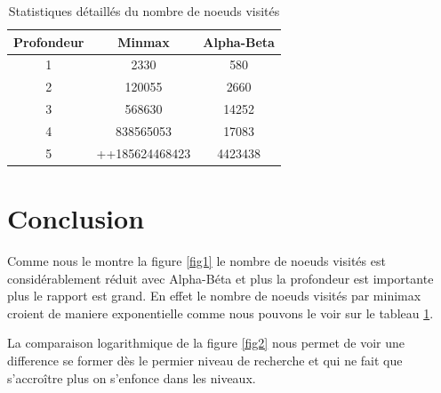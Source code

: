 \documentclass[12pt]{article}
\begin{document}
\newpage
\begin{table}[ht!]
    \centering
    
        \begin{tabular}{ |c |c |c|}
        \hline
        \textbf{Profondeur} & \textbf{Minmax} & \textbf{Alpha-Beta}\\
        \hline
        1 & 2330 & 580\\
        \hline
        2 & 120055 & 2660\\
        \hline
        3 & 568630 & 14252\\
        \hline
        4 & 838565053 & 17083\\ 
        \hline
        5 & ++185624468423 & 4423438\\
        \hline
        \end{tabular}
        \caption{Statistiques détaillés du nombre de noeuds visités}
        \label{tab1}
    
    \end{table}

\section{Conclusion}    
Comme nous le montre la figure \ref{fig1}  le nombre de  noeuds visités est considérablement
réduit avec Alpha-Béta et plus la profondeur est importante plus le rapport est grand.
En effet le nombre de noeuds visités par minimax croient de maniere exponentielle comme nous
pouvons le voir sur le tableau \ref{tab1}.

La comparaison logarithmique de la figure \ref{fig2} nous permet de voir une difference se former
dès le permier niveau de recherche et qui ne fait que s'accroître plus on s'enfonce dans les 
niveaux.
\end{document}
